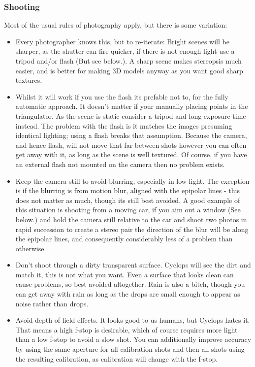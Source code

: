 \documentclass[10pt,a4paper,twoside]{article}
\begin{document}
\subsubsection{Shooting}
Most of the usual rules of photography apply, but there is some variation:
\begin{itemize}
\item Every photographer knows this, but to re-iterate: Bright scenes will be sharper, as the shutter can fire quicker, if there is not enough light use a tripod and/or flash (But see below.). A sharp scene makes stereopsis much easier, and is better for making 3D models anyway as you want good sharp textures.

\item Whilst it will work if you use the flash its prefable not to, for the fully automatic approach. It doesn't matter if your manually placing points in the triangulator. As the scene is static consider a tripod and long exposure time instead. The problem with the flash is it matches the images presuming identical lighting; using a flash breaks that assumption. Because the camera, and hence flash, will not move that far between shots however you can often get away with it, as long as the scene is well textured. Of course, if you have an external flash not mounted on the camera then no problem exists.

\item Keep the camera still to avoid blurring, especially in low light. The exception is if the blurring is from motion blur, aligned with the epipolar lines - this does not matter as much, though its still best avoided. A good example of this situation is shooting from a moving car, if you aim out a window (See below.) and hold the camera still relative to the car and shoot two photos in rapid succession to create a stereo pair the direction of the blur will be along the epipolar lines, and consequently considerably less of a problem than otherwise.

\item Don't shoot through a dirty transparent surface. Cyclops will see the dirt and match it, this is not what you want. Even a surface that looks clean can cause problems, so best avoided altogether. Rain is also a bitch, though you can get away with rain as long as the drops are small enough to appear as noise rather than drops.

\item Avoid depth of field effects. It looks good to us humans, but Cyclops hates it. That means a high f-stop is desirable, which of course requires more light than a low f-stop to avoid a slow shot. You can additionally improve accuracy by using the same aperture for all calibration shots and then all shots using the resulting calibration, as calibration will change with the f-stop.


\end{itemize}
\end{document}
